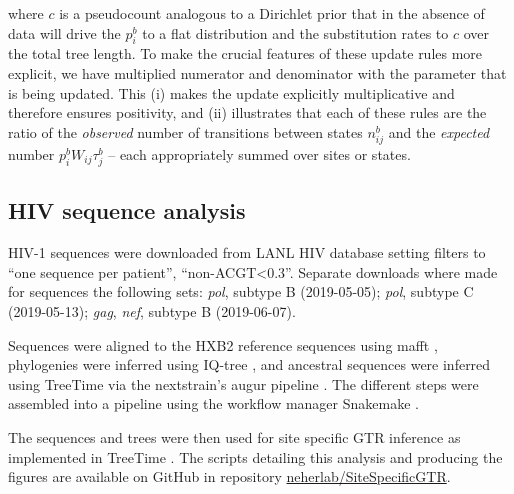 \documentclass[aps,rmp,twocolumn]{revtex4}
\newcommand{\gene}[1]{{\it #1}}
\newcommand{\eqp}{p}
\newcommand{\pc}{c}
\begin{document}
where $\pc$ is a pseudocount analogous to a Dirichlet prior that in the absence of data will drive the $\eqp_i^b$ to a flat distribution and the substitution rates to $\pc$ over the total tree length.
To make the crucial features of these update rules more explicit, we have multiplied numerator and denominator with the parameter that is being updated. This (i) makes the update explicitly multiplicative and therefore ensures positivity, and (ii) illustrates that each of these rules are the ratio of the {\it observed} number of transitions between states $n^b_{ij}$ and the {\it expected} number $\eqp^b_i W_{ij}\tau_j^b$ -- each appropriately summed over sites or states.


\subsection*{HIV sequence analysis}
HIV-1 sequences were downloaded from LANL HIV database \citep{LANL} setting filters to ``one sequence per patient'', ``non-ACGT\textless 0.3''.
Separate downloads where made for sequences the following sets: \gene{pol}, subtype B (2019-05-05); \gene{pol}, subtype C (2019-05-13); \gene{gag}, \gene{nef}, subtype B (2019-06-07).

Sequences were aligned to the HXB2 reference sequences using mafft \citep{katoh2013mafft}, phylogenies were inferred using IQ-tree \citep{nguyen_iq-tree:_2015}, and ancestral sequences were inferred using TreeTime \citep{sagulenko2017treetime} via the nextstrain's augur pipeline \citep{hadfield_nextstrain:_2018}.
The different steps were assembled into a pipeline using the workflow manager Snakemake \citep{koster_snakemakescalable_2012}.

The sequences and trees were then used for site specific GTR inference as implemented in TreeTime \citep{sagulenko2017treetime}.
The scripts detailing this analysis and producing the figures are available on GitHub in repository \href{https://github.com/neherlab/SiteSpecificGTR}{neherlab/SiteSpecificGTR}.

\clearpage
\appendix
\renewcommand{\thefigure}{S\arabic{figure}}
\renewcommand{\thetable}{S\arabic{table}}
\setcounter{figure}{0}
\setcounter{table}{0}
\end{document}
